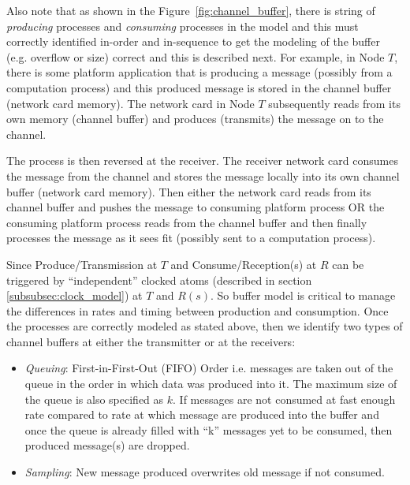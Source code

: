 Also note that as shown in the Figure~\ref{fig:channel_buffer}, there is string of \emph{producing} processes and \emph{consuming} processes in the model and this must correctly identified in-order and in-sequence to get the modeling of the buffer (e.g. overflow or size) correct and this is described next. For example, in Node $T$, there is some platform application that is producing a message (possibly from a computation process) and this produced message is stored in the channel buffer (network card memory). The network card in Node $T$ subsequently reads from its own memory (channel buffer) and produces (transmits) the message on to the channel. 

The process is then reversed at the receiver. The receiver network card consumes the message from the channel and stores the message locally into its own channel buffer (network card memory). Then either the network card reads from its channel buffer and pushes the message to consuming platform process OR the consuming platform process reads from the channel buffer and then finally processes the message as it sees fit (possibly sent to a computation process).

Since Produce/Transmission at $T$ and Consume/Reception(s) at $R$ can be triggered by ``independent'' clocked atoms (described in section \ref{subsubsec:clock_model}) at $T$ and $R(s)$. So buffer model is critical to manage the differences in rates and timing between production and consumption. Once the processes are correctly modeled as stated above, then we identify two types of channel buffers at either the transmitter or at the receivers:
\begin{itemize}
\item \emph{Queuing}: First-in-First-Out (FIFO) Order i.e. messages are taken out of the queue in the order in which data was produced into it.  The maximum size of the queue is also specified as $k$. If messages are not consumed at fast enough rate compared to rate at which message are produced into the buffer and once the queue is already filled with ``k'' messages yet to be consumed, then produced message(s) are dropped. 

\item \emph{Sampling}: New message produced overwrites old message if not consumed.

\end{itemize}


